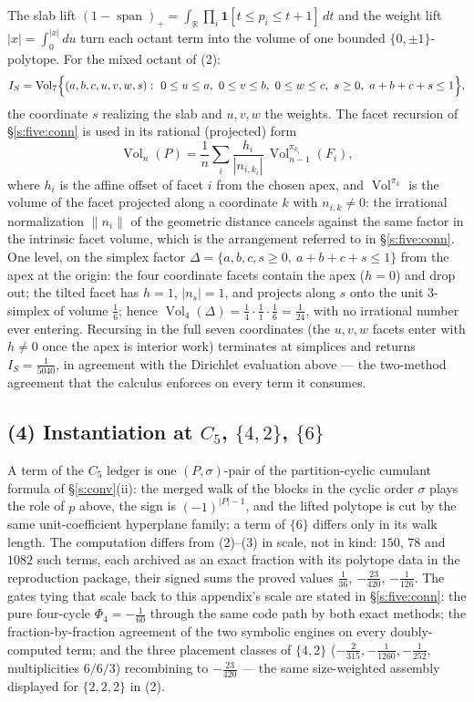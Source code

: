 \documentclass[11pt]{article}
\numberwithin{equation}{section}
\theoremstyle{definition}
\theoremstyle{remark}
\begin{document}
The slab lift $(1-\operatorname{span})_{+}
=\int_{\mathbb R}\prod_i\mathbf 1[t\le p_i\le t+1]\,dt$ and the
weight lift $|x|=\int_0^{|x|}du$ turn each octant term into the
volume of one bounded $\{0,\pm1\}$-polytope. For the mixed
octant of (2):
\[
I_S=\operatorname{Vol}_7\Bigl\{(a,b,c,u,v,w,s):\
0\le u\le a,\ 0\le v\le b,\ 0\le w\le c,\ s\ge0,\
a+b+c+s\le1\Bigr\},
\]
the coordinate $s$ realizing the slab and $u,v,w$ the weights.
The facet recursion of \S\ref{s:five:conn} is used in its
rational (projected) form
\[
\operatorname{Vol}_n(P)=\frac1n\sum_i
\frac{h_i}{|n_{i,k_i}|}\,
\operatorname{Vol}_{n-1}^{\pi_{k_i}}(F_i),
\]
where $h_i$ is the affine offset of facet $i$ from the chosen
apex, and $\operatorname{Vol}^{\pi_k}$ is the volume of the
facet projected along a coordinate $k$ with $n_{i,k}\ne0$: the
irrational normalization $\|n_i\|$ of the geometric distance
cancels against the same factor in the intrinsic facet volume,
which is the arrangement referred to in \S\ref{s:five:conn}.
One level, on the simplex factor
$\Delta=\{a,b,c,s\ge0,\ a{+}b{+}c{+}s\le1\}$ from the apex at
the origin: the four coordinate facets contain the apex
($h=0$) and drop out; the tilted facet has $h=1$, $|n_s|=1$,
and projects along $s$ onto the unit $3$-simplex of volume
$\tfrac16$; hence
$\operatorname{Vol}_4(\Delta)=\tfrac14\cdot\tfrac{1}{1}\cdot
\tfrac16=\tfrac1{24}$, with no irrational number ever entering.
Recursing in the full seven coordinates (the $u,v,w$ facets
enter with $h\ne0$ once the apex is interior work) terminates
at simplices and returns $I_S=\tfrac1{5040}$, in agreement with
the Dirichlet evaluation above --- the two-method agreement
that the calculus enforces on every term it consumes.

\subsection*{(4) Instantiation at $C_5$, $\{4,2\}$, $\{6\}$}

A term of the $C_5$ ledger is one $(P,\sigma)$-pair of the
partition-cyclic cumulant formula of \S\ref{s:conv}(ii): the
merged walk of the blocks in the cyclic order $\sigma$ plays
the role of $p$ above, the sign is $(-1)^{|P|-1}$, and the
lifted polytope is cut by the same unit-coefficient hyperplane
family; a term of $\{6\}$ differs only in its walk length. The
computation differs from (2)--(3) in scale, not in kind: $150$, $78$
and $1082$ such terms, each archived as an exact fraction with
its polytope data in the reproduction package, their signed
sums the proved values $\tfrac1{36}$, $-\tfrac{23}{420}$,
$-\tfrac1{126}$. The gates tying that scale back to this
appendix's scale are stated in \S\ref{s:five:conn}: the pure
four-cycle $\Phi_4=-\tfrac1{60}$ through the same code path by
both exact methods; the fraction-by-fraction agreement of the
two symbolic engines on every doubly-computed term; and the
three placement classes of $\{4,2\}$
($-\tfrac2{315},-\tfrac1{1260},-\tfrac1{252}$, multiplicities
$6/6/3$) recombining to $-\tfrac{23}{420}$ --- the same
size-weighted assembly displayed for $\{2,2,2\}$ in (2).
\end{document}
